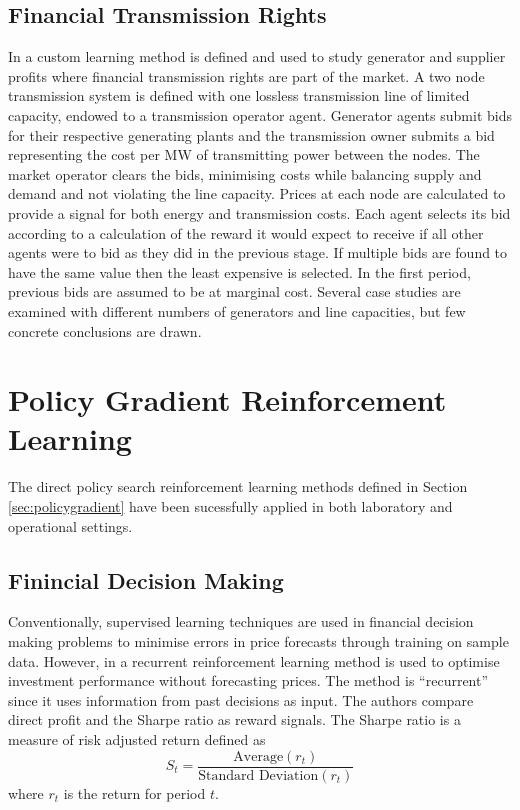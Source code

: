 \subsection{Financial Transmission Rights}
In \cite{ernst:04} a custom learning method is defined and used to study
generator and supplier profits where financial transmission rights are part of
the market.  A two node transmission system is defined with one lossless
transmission line of limited capacity, endowed to a transmission operator
agent.  Generator agents submit bids for their respective generating plants
and the transmission owner submits a bid representing the cost per MW of
transmitting power between the nodes.  The market operator clears the bids,
minimising costs while balancing supply and demand and not violating the line
capacity.  Prices at each node are calculated to provide a signal for both
energy and transmission costs.  Each agent selects its bid according to a
calculation of the reward it would expect to receive if all other agents were
to bid as they did in the previous stage.  If multiple bids are found to have
the same value then the least expensive is selected.  In the first period,
previous bids are assumed to be at marginal cost.  Several case studies are
examined with different numbers of generators and line capacities, but few
concrete conclusions are drawn.

\section{Policy Gradient Reinforcement Learning}
The direct policy search reinforcement learning methods defined in Section
\ref{sec:policygradient} have been sucessfully applied in both laboratory and
operational settings.

\subsection{Finincial Decision Making}
Conventionally, supervised learning techniques are used in financial decision
making problems to minimise errors in price forecasts through training on
sample data.  However, in \cite{moody:98} a recurrent reinforcement learning
method is used to optimise investment performance without forecasting prices.
The method is ``recurrent'' since it uses information from past decisions as
input.  The authors compare direct profit and the Sharpe ratio
\cite{sharpe:ratio66,sharpe:ratio94} as reward signals. The Sharpe ratio is a
measure of risk adjusted return defined as
\begin{equation}
S_t = \frac{\mbox{Average}(r_t)}{\mbox{Standard Deviation}(r_t)}
\end{equation}
where $r_t$ is the return for period $t$.


